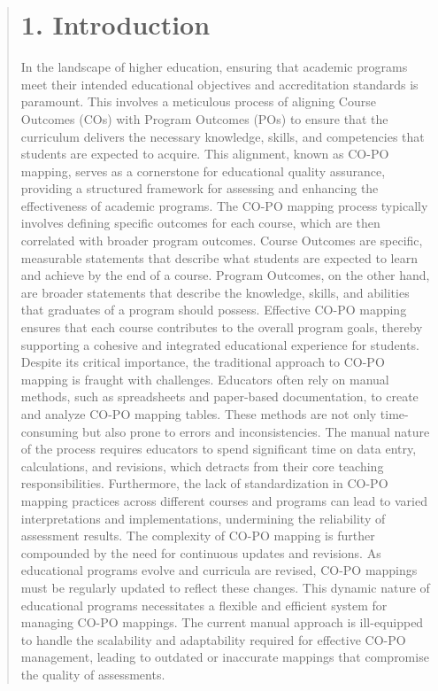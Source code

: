 \documentclass[12pt]{report}
\begin{document}
	
	\begin{quote}
		\setcounter{page}{1}
		\section{ 1. Introduction}
		\hspace{1cm}In the landscape of higher education, ensuring that academic programs meet their intended educational objectives and accreditation standards is paramount. This involves a meticulous process of aligning Course Outcomes (COs) with Program Outcomes (POs) to ensure that the curriculum delivers the necessary knowledge, skills, and competencies that students are expected to acquire. This alignment, known as CO-PO mapping, serves as a cornerstone for educational quality assurance, providing a structured framework for assessing and enhancing the effectiveness of academic programs.
		The CO-PO mapping process typically involves defining specific outcomes for each course, which are then correlated with broader program outcomes. Course Outcomes are specific, measurable statements that describe what students are expected to learn and achieve by the end of a course. Program Outcomes, on the other hand, are broader statements that describe the knowledge, skills, and abilities that graduates of a program should possess. Effective CO-PO mapping ensures that each course contributes to the overall program goals, thereby supporting a cohesive and integrated educational experience for students.
		\\ \vspace{1ex} 
		Despite its critical importance, the traditional approach to CO-PO mapping is fraught with challenges. Educators often rely on manual methods, such as spreadsheets and paper-based documentation, to create and analyze CO-PO mapping tables. These methods are not only time-consuming but also prone to errors and inconsistencies. The manual nature of the process requires educators to spend significant time on data entry, calculations, and revisions, which detracts from their core teaching responsibilities. Furthermore, the lack of standardization in CO-PO mapping practices across different courses and programs can lead to varied interpretations and implementations, undermining the reliability of assessment results.
		The complexity of CO-PO mapping is further compounded by the need for continuous updates and revisions. As educational programs evolve and curricula are revised, CO-PO mappings must be regularly updated to reflect these changes. This dynamic nature of educational programs necessitates a flexible and efficient system for managing CO-PO mappings. The current manual approach is ill-equipped to handle the scalability and adaptability required for effective CO-PO management, leading to outdated or inaccurate mappings that compromise the quality of assessments.
		\clearpage
		

\end{quote}
\end{document}
